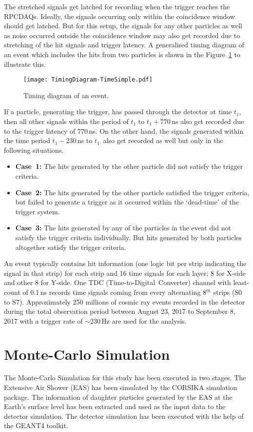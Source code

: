 The stretched signals get latched for recording when the trigger
reaches the RPCDAQs. Ideally, the signals occurring only within the
coincidence window should get latched. But for this setup, the signals
for any other particles as well as noise occurred outside the
coincidence window may also get recorded due to stretching of the hit
signals and trigger latency. A generalised timing diagram of an event
which includes the hits from two particles is shown in the
Figure~\ref{fig:timingdiagram} to illustrate this.
\begin{figure}[h]
  \texttt{[image: TimingDiagram-TimeSimple.pdf]} 
  \caption{Timing diagram of an event.}
  \label{fig:timingdiagram}
\end{figure}
If a particle, generating the trigger, has passed through the
detector at time $t_{1}$, then all other signals within the period of
$t_{1}$ to $t_{1}+770$\,ns also get recorded due to the trigger latency
of 770\,ns. On the other hand, the signals generated within the time
period $t_{1}-230$\,ns to $t_{1}$\ also get recorded as well but only in
the following situations.
\vspace*{-10pt}
\begin{itemize} \itemsep -5pt
\item \textbf{Case~1:} The hits generated by the other particle did
  not satisfy the trigger criteria.
\item \textbf{Case~2:} The hits generated by the other particle
  satisfied the trigger criteria, but failed to generate a trigger
  as it occurred within the `dead-time' of the trigger system.
\item \textbf{Case~3:} The hits generated by any of the particles in
  the event did not satisfy the trigger criteria individually.
  But hits generated by both particles altogether satisfy the trigger
  criteria.
\end{itemize}

An event typically contains hit information (one logic bit per strip
indicating the signal in that strip) for each strip and 16 time
signals for each layer; 8 for X-side and other 8 for Y-side.
One TDC (Time-to-Digital~Converter) channel with least-count of 0.1\,ns
records time signals coming from every alternating 8$^{th}$ strips
(S0 to S7). Approximately 250 millions of cosmic ray events
recorded in the detector during the total observation period between
August 23, 2017 to September 8, 2017 with a trigger rate of
$\sim$230\,Hz are used for the analysis.


\section{Monte-Carlo Simulation} \label{sec:montecarlo}
The Monte-Carlo Simulation for this study has been executed in
two stages. The Extensive Air Shower (EAS) has been simulated
by the CORSIKA simulation package\cite{corsika763}. The information
of daughter particles generated by the EAS at the Earth's surface
level has been extracted and used as the input data to the detector
simulation. The detector simulation has been executed with the help
of the GEANT4 toolkit\cite{geant4}.

